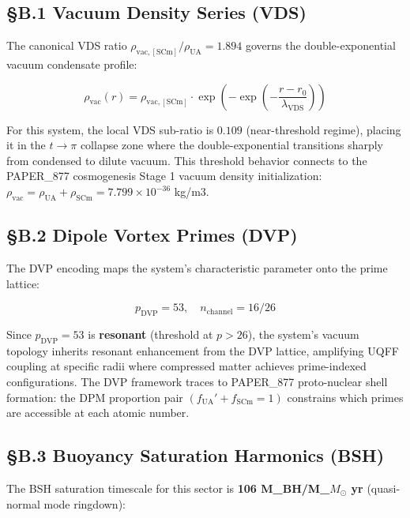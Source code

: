 \documentclass[12pt,a4paper]{article}
\begin{document}
\subsection{\S{}B.1 Vacuum Density Series (VDS)}

The canonical VDS ratio $\rho_{\mathrm{vac,[SCm]}} / \rho_{\mathrm{UA}} = 1.894$ governs the double-exponential vacuum condensate profile:

\begin{equation}
\rho_{\mathrm{vac}}(r) = \rho_{\mathrm{vac,[SCm]}} \cdot \exp\!\left(-\exp\!\left(-\frac{r - r_0}{\lambda_{\mathrm{VDS}}}\right)\right)
\end{equation}

For this system, the local VDS sub-ratio is $0.109$ (near-threshold regime), placing it in the $t \to \pi$ collapse zone where the double-exponential transitions sharply from condensed to dilute vacuum. This threshold behavior connects to the PAPER\_877 cosmogenesis Stage 1 vacuum density initialization: $\rho_{\mathrm{vac}} = \rho_{\mathrm{UA}} + \rho_{\mathrm{SCm}} = 7.799 \times 10^{-36}$ kg/m3.

\subsection{\S{}B.2 Dipole Vortex Primes (DVP)}

The DVP encoding maps the system's characteristic parameter onto the prime lattice:

\begin{equation}
p_{\mathrm{DVP}} = 53, \quad n_{\mathrm{channel}} = 16/26
\end{equation}

Since $p_{\mathrm{DVP}} = 53$ is \textbf{resonant} (threshold at $p > 26$), the system's vacuum topology inherits resonant enhancement from the DVP lattice, amplifying UQFF coupling at specific radii where compressed matter achieves prime-indexed configurations. The DVP framework traces to PAPER\_877 proto-nuclear shell formation: the DPM proportion pair $(f_{\mathrm{UA}}' + f_{\mathrm{SCm}} = 1)$ constrains which primes are accessible at each atomic number.

\subsection{\S{}B.3 Buoyancy Saturation Harmonics (BSH)}

The BSH saturation timescale for this sector is \textbf{106 M\_BH/M\_{$M_{\odot}$} yr} (quasi-normal mode ringdown):
\end{document}
